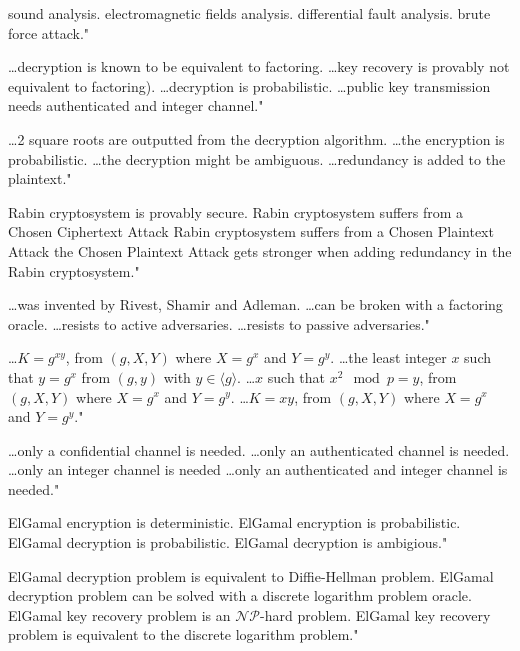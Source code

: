 {sound analysis.}
{electromagnetic fields analysis.}
{differential fault analysis.}
{brute force attack."}

{\ldots decryption is known to be equivalent to factoring.}
{\ldots key recovery is provably not equivalent to factoring).}
{\ldots decryption is probabilistic.}
{\ldots public key transmission needs authenticated and integer channel."}

{\ldots 2 square roots are outputted from the decryption algorithm.}
{\ldots the encryption is probabilistic.}
{\ldots the decryption might be ambiguous.}
{\ldots redundancy is added to the plaintext."}

{Rabin cryptosystem is provably secure.}
{Rabin cryptosystem suffers from a Chosen Ciphertext Attack}
{Rabin cryptosystem suffers from a Chosen Plaintext Attack}
{the Chosen Plaintext Attack gets stronger when adding redundancy in the Rabin cryptosystem."}

{\ldots was invented by Rivest, Shamir and Adleman.}
{\ldots can be broken with a factoring oracle.}
{\ldots resists to active adversaries.}
{\ldots resists to passive adversaries."}

{\ldots $K=g^{xy}$, from $(g,X,Y)$ where $X=g^x$ and $Y=g^y$.}
{\ldots the least integer $x$ such that $y=g^x$ from $(g,y)$ with $y\in \langle g\rangle$.}
{\ldots $x$ such that $x^2\mod p = y$, from $(g,X,Y)$ where $X=g^x$ and $Y=g^y$.}
{\ldots $K=xy$, from $(g,X,Y)$ where $X=g^x$ and $Y=g^y$."}

{\ldots only a confidential channel is needed.}
{\ldots only an authenticated channel is needed.}
{\ldots only an integer channel is needed}
{\ldots only an authenticated and integer channel is needed."}

{ElGamal encryption is deterministic.}
{ElGamal encryption is probabilistic.}
{ElGamal decryption is probabilistic.}
{ElGamal decryption is ambigious."}

{ElGamal decryption problem is equivalent to Diffie-Hellman problem.}
{ElGamal decryption problem can be solved with a discrete logarithm problem oracle.}
{ElGamal key recovery problem is an $\mathcal{NP}$-hard problem.}
{ElGamal key recovery problem is equivalent to the discrete logarithm problem."}

